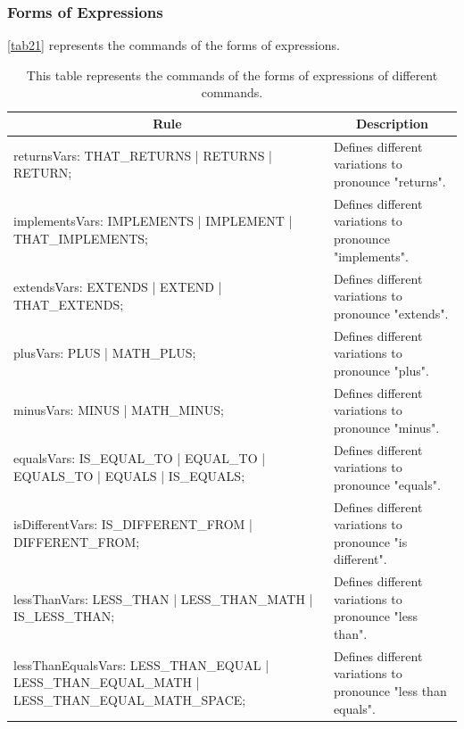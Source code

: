 \subsubsection{Forms of Expressions}
\autoref{tab21} represents the commands of the forms of expressions.

\begin{table}[H]
	\centering
	\begin{tabular}{|p{8cm}|p{7cm}|}
		\hline
		\multicolumn{1}{|c|}{{\bf Rule}} & \multicolumn{1}{c|}{{\bf Description}} \\ \hline
		returnsVars: THAT\_RETURNS | RETURNS | RETURN; & Defines different variations to pronounce "returns". \\ \hline
		implementsVars: IMPLEMENTS | IMPLEMENT | THAT\_IMPLEMENTS; & Defines different variations to pronounce "implements". \\ \hline
		extendsVars: EXTENDS | EXTEND | THAT\_EXTENDS; & Defines different variations to pronounce "extends". \\ \hline
		plusVars: PLUS | MATH\_PLUS; & Defines different variations to pronounce "plus". \\ \hline
		minusVars: MINUS | MATH\_MINUS; & Defines different variations to pronounce "minus". \\ \hline
		equalsVars: IS\_EQUAL\_TO | EQUAL\_TO | EQUALS\_TO | EQUALS | IS\_EQUALS; & Defines different variations to pronounce "equals". \\ \hline
		isDifferentVars: IS\_DIFFERENT\_FROM | DIFFERENT\_FROM; & Defines different variations to pronounce "is different". \\ \hline
		lessThanVars: LESS\_THAN | LESS\_THAN\_MATH | IS\_LESS\_THAN; & Defines different variations to pronounce "less than". \\ \hline
		lessThanEqualsVars: LESS\_THAN\_EQUAL | LESS\_THAN\_EQUAL\_MATH | LESS\_THAN\_EQUAL\_MATH\_SPACE; & Defines different variations to pronounce "less than equals". \\ \hline
	\end{tabular}
		\caption{This table represents the commands of the forms of expressions of different commands.}
		\label{tab21}
\end{table}

